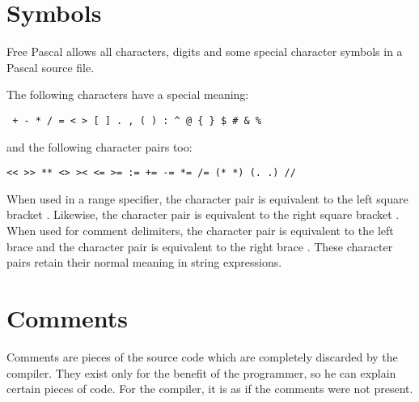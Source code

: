\section{Symbols}
Free Pascal allows all characters, digits and some special character symbols
in a Pascal source file.

The following characters have a special meaning:
\begin{verbatim}
 + - * / = < > [ ] . , ( ) : ^ @ { } $ # & %
\end{verbatim}
and the following character pairs too:
\begin{verbatim}
<< >> ** <> >< <= >= := += -= *= /= (* *) (. .) //
\end{verbatim}
When used in a range specifier, the character pair  is equivalent to
the left square bracket \var{[}. Likewise, the character pair  is
equivalent to the right square bracket \var{]}.
When used for comment delimiters, the character pair \var{(*} is equivalent
to the  left brace \var{\{} and the character pair \var{*)} is equivalent
to the right brace \var{\}}.
These character pairs retain their normal meaning in string expressions.


\section{Comments}
Comments are pieces of the source code which are completely discarded by the
compiler. They exist only for the benefit of the programmer, so he can
explain certain pieces of code. For the compiler, it is as if the comments
were not present.

